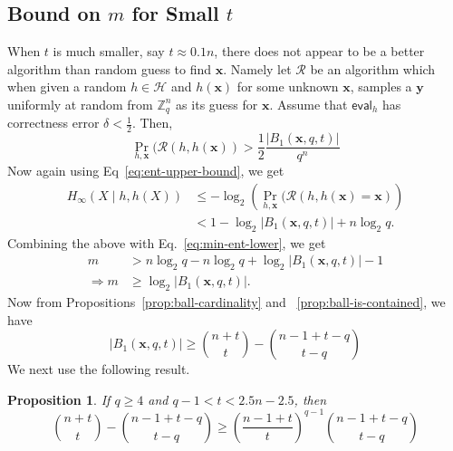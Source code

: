 \documentclass[pdflatex,sn-mathphys-num]{sn-jnl}
\newtheorem{proposition}{Proposition}
\theoremstyle{definition}
\newcommand{\vtr}[1]{\mathbf{#1}}
\begin{document}
\subsection{\texorpdfstring{Bound on $m$ for Small $t$}{Bound on m for Small t}}
When $t$ is much smaller, say $t \approx 0.1 n$, there does not appear to be a better algorithm than random guess to find $\vtr{x}$. Namely let $\mathcal{R}$ be an algorithm which when given a random $h \in \mathcal{H}$ and $h(\vtr{x})$ for some unknown $\vtr{x}$, samples a $\vtr{y}$ uniformly at random from $\mathbb{Z}_q^n$ as its guess for $\vtr{x}$. Assume that $\mathsf{eval}_h$ has correctness error $\delta < \frac{1}{2}$. Then,
\[
\Pr_{h, \vtr{x}} ( \mathcal{R}(h, h(\vtr{x})) > \frac{1}{2}\frac{|B_1(\vtr{x}, q, t)|}{q^n} 
\]
Now again using Eq~\eqref{eq:ent-upper-bound}, we get
\begin{align}
 H_\infty(X \mid h, h(X)) &\leq -\log_2 \left(\Pr_{h, \vtr{x} } ( \mathcal{R}(h, h(\vtr{x}) = \vtr{x}) \right) \nonumber \\
 &< 1 - \log_2 |B_1(\vtr{x}, q, t)| + n \log_2 q. \nonumber 
\end{align}
Combining the above with Eq.~\eqref{eq:min-ent-lower}, we get
\begin{align}
    m & >n\log_2 q - n \log_2 q + \log_2 |B_1(\vtr{x}, q, t)| - 1  \nonumber\\
\Rightarrow m &\geq \log_2 |B_1(\vtr{x}, q, t)| \nonumber. 
\end{align}
Now from Propositions~\ref{prop:ball-cardinality} and ~\ref{prop:ball-is-contained}, we have
\[
    |B_1(\vtr{x}, q, t)| \geq \binom{n + t}{t} - \binom{n -1 + t - q}{t-q} 
\]
We next use the following result. 
\begin{proposition}
\label{prop:binom-subtract-bound}
If $q \geq 4$ and $q-1< t < 2.5n - 2.5$, then  
\[
\binom{n + t}{t} - \binom{n -1 + t - q}{t-q} \geq \left( \frac{n-1 + t}{t} \right)^{q-1}  \binom{n -1 + t - q}{t-q}
\]
\end{proposition}
\end{document}

